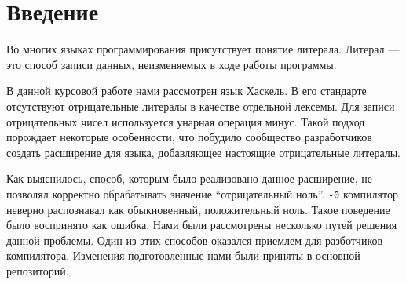 \chapter*{Введение}

Во многих языках программирования присутствует понятие литерала. Литерал ---
это способ записи данных, неизменяемых в ходе работы
программы.\cite{cs-encyclopedia}

В данной курсовой работе нами рассмотрен язык Хаскель. В его стандарте
\cite{haskell2010} отсутствуют отрицательные литералы в качестве отдельной
лексемы.  Для записи отрицательных чисел используется унарная операция минус.
Такой подход порождает некоторые особенности, что побудило сообщество
разработчиков создать расширение для языка, добавляющее настоящие отрицательные
литералы.

Как выяснилось, способ, которым было реализовано данное расширение, не позволял
корректно обрабатывать значение ``отрицательный ноль''. \texttt{-0} компилятор
неверно распознавал как обыкновенный, положительный ноль. Такое поведение было
воспринято как ошибка. Нами были рассмотрены несколько путей решения данной
проблемы. Один из этих способов оказался приемлем для разботчиков компилятора.
Изменения подготовленные нами были приняты в основной репозиторий.
